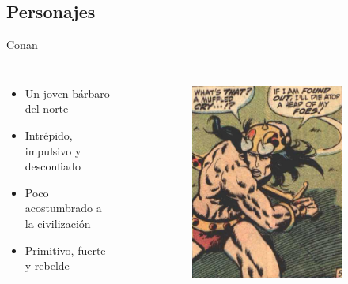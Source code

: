 \subsection{Personajes}
\begin{frame}{Conan}
\begin{columns}
\begin{itemize}
 \item Un joven bárbaro del norte
 \item Intrépido, impulsivo y desconfiado
 \item Poco acostumbrado a la civilización
 \item Primitivo, fuerte y rebelde
\end{itemize}
\begin{figure}[htp]
 \centering
 \begin{subfigure}[b]{0.3\textwidth}
   \includegraphics[width=\textwidth]{img/conan/CTB}
 \end{subfigure}
~
 \begin{subfigure}[b]{0.27\textwidth}

\end{subfigure}
\end{figure}
\end{columns}
\end{frame}
